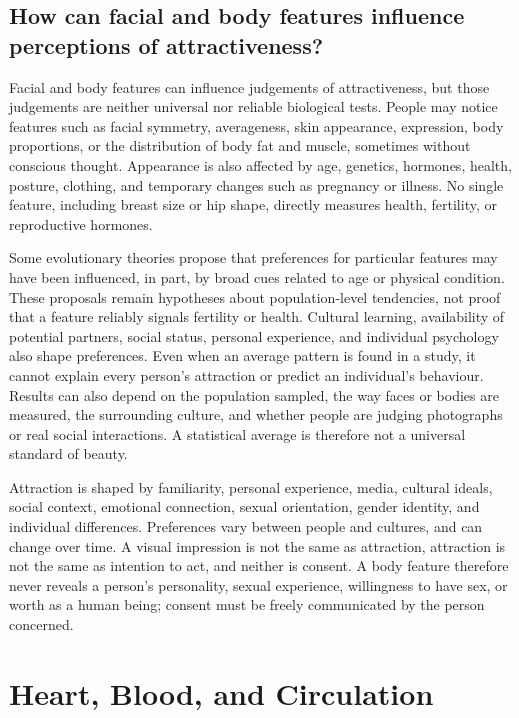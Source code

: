\documentclass[11pt,oneside]{report}
\begin{document}
\section{How can facial and body features influence perceptions of attractiveness?}

Facial and body features can influence judgements of attractiveness, but those
judgements are neither universal nor reliable biological tests. People may notice
features such as facial symmetry, averageness, skin appearance, expression,
body proportions, or the distribution of body fat and muscle, sometimes without
conscious thought. Appearance is also affected by age, genetics, hormones,
health, posture, clothing, and temporary changes such as pregnancy or illness.
No single feature, including breast size or hip shape, directly measures health,
fertility, or reproductive hormones.

Some evolutionary theories propose that preferences for particular features may
have been influenced, in part, by broad cues related to age or physical
condition. These proposals remain hypotheses about population-level tendencies,
not proof that a feature reliably signals fertility or health. Cultural learning,
availability of potential partners, social status, personal experience, and
individual psychology also shape preferences. Even when an average pattern is
found in a study, it cannot explain every person's attraction or predict an
individual's behaviour. Results can also depend on the population sampled, the
way faces or bodies are measured, the surrounding culture, and whether people
are judging photographs or real social interactions. A statistical average is
therefore not a universal standard of beauty.

Attraction is shaped by familiarity, personal experience, media, cultural
ideals, social context, emotional connection, sexual orientation, gender
identity, and individual differences. Preferences vary between people and
cultures, and can change over time. A visual impression is not the same as
attraction, attraction is not the same as intention to act, and neither is
consent. A body feature therefore never reveals a person's personality, sexual
experience, willingness to have sex, or worth as a human being; consent must be
freely communicated by the person concerned.

\chapter{Heart, Blood, and Circulation}
\end{document}
